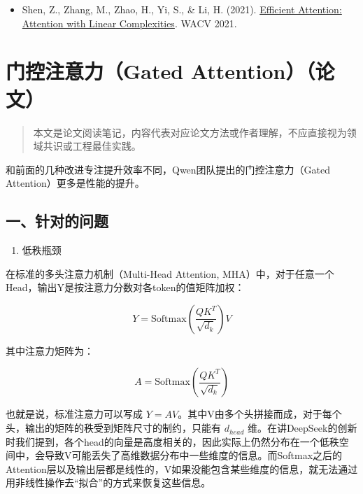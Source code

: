 \begin{itemize}
\tightlist
\item
  Shen, Z., Zhang, M., Zhao, H., Yi, S., \& Li, H. (2021). \href{https://arxiv.org/abs/1812.01243}{Efficient Attention: Attention with Linear Complexities}. WACV 2021.
\end{itemize}

\clearpage

\hypertarget{ux95e8ux63a7ux6ce8ux610fux529bgated-attentionux8bbaux6587}{%
\section{门控注意力（Gated Attention）（论文）}\label{ux95e8ux63a7ux6ce8ux610fux529bgated-attentionux8bbaux6587}}

\begin{quote}
本文是论文阅读笔记，内容代表对应论文方法或作者理解，不应直接视为领域共识或工程最佳实践。
\end{quote}

和前面的几种改进专注提升效率不同，Qwen团队提出的门控注意力（Gated Attention）更多是性能的提升。

\hypertarget{ux4e00ux9488ux5bf9ux7684ux95eeux9898}{%
\subsection{一、针对的问题}\label{ux4e00ux9488ux5bf9ux7684ux95eeux9898}}

\begin{enumerate}
\def\labelenumi{\arabic{enumi}.}
\tightlist
\item
  低秩瓶颈
\end{enumerate}

在标准的多头注意力机制（Multi-Head Attention, MHA）中，对于任意一个Head，输出Y是按注意力分数对各token的值矩阵加权：

\[
Y=\mathrm{Softmax}\left(\frac{QK^T}{\sqrt{d_k}}\right)V
\]

其中注意力矩阵为：

\[
A=\mathrm{Softmax}\left(\frac{QK^T}{\sqrt{d_k}}\right)
\]

也就是说，标准注意力可以写成 \(Y=AV\)。其中V由多个头拼接而成，对于每个头，输出的矩阵的秩受到矩阵尺寸的制约，只能有 \(d_{head}\) 维。在讲DeepSeek的创新时我们提到，各个head的向量是高度相关的，因此实际上仍然分布在一个低秩空间中，会导致V可能丢失了高维数据分布中一些维度的信息。而Softmax之后的Attention层以及输出层都是线性的，V如果没能包含某些维度的信息，就无法通过用非线性操作去``拟合''的方式来恢复这些信息。

